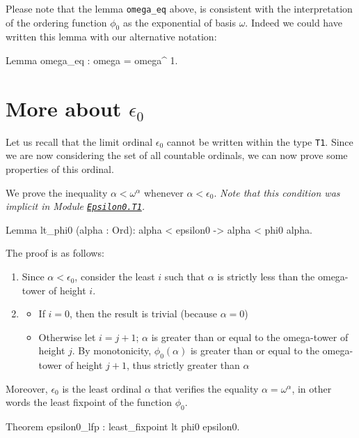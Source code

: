 {Please note that the lemma \texttt{omega\_eq} above, is consistent with the interpretation of the ordering function $\phi_0$ as the exponential of basis $\omega$. Indeed we could have written this lemma with our alternative notation:

\begin{Coqsrc}
 Lemma omega_eq : omega = omega^ 1.
\end{Coqsrc}

\section{More about \texorpdfstring{$\epsilon_0$}{\texttt{epsilon0}}}

Let us recall that the limit ordinal  $\epsilon_0$ cannot be written within the type \texttt{T1}. Since we are now considering the set of all countable ordinals, we can now prove some properties of this ordinal.


We prove the inequality  $\alpha<\omega^\alpha$ whenever $\alpha < \epsilon_0$.
\emph{Note that this condition was implicit in Module \href{../theories/html/hydras.Epsilon0/T1.html\#lt_phi0}%
{\texttt{Epsilon0.T1}}.}

\begin{Coqsrc}
Lemma lt_phi0 (alpha : Ord):
  alpha < epsilon0 -> alpha < phi0 alpha.
\end{Coqsrc}

The proof is as follows:
\begin{enumerate}
\item Since $\alpha<\epsilon_0$, consider the least $i$ such that $\alpha$ is strictly less than the omega-tower of height $i$.
\item
  \begin{itemize}
  \item If $i=0$, then the result is trivial (because $\alpha=0$)
 \item  Otherwise let $i=j+1$; 
          $\alpha$ is greater than or equal to the omega-tower of height $j$.
         By monotonicity,  $\phi_0(\alpha)$ is greater than or equal to 
        the omega-tower of height $j+1$, thus strictly greater than $\alpha$
  \end{itemize}
 \end{enumerate}

Moreover,  $\epsilon_0$ is the least ordinal $\alpha$ that verifies the equality 
$\alpha = \omega^\alpha$, in other words the least fixpoint of the function  $\phi_0$.

\begin{Coqsrc}
Theorem epsilon0_lfp : least_fixpoint lt phi0 epsilon0.
\end{Coqsrc}


}
